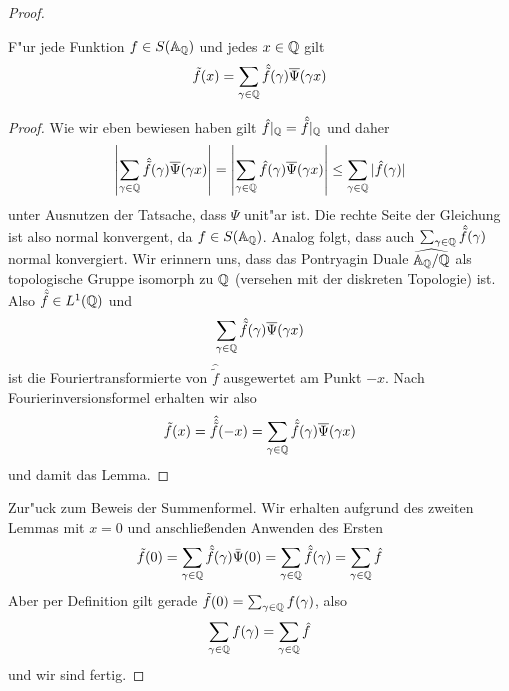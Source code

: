 \begin{proof}
		\begin{lemma}
			F"ur jede Funktion $f \in S(\mathbb{A}_{\mathbb{Q}})$ und jedes $x\in \mathbb{Q}$ gilt
			\begin{align*}
				\tilde{f}(x) = \sum_{\gamma \in \mathbb{Q}} {\hat{\tilde{f}}(\gamma)\overline{\Psi}(\gamma x)}
			\end{align*}
		\end{lemma}
		\begin{proof}
			Wie wir eben bewiesen haben gilt $\hat{f}|_{\mathbb{Q}} = \hat{\tilde{f}}|_{\mathbb{Q}}$ und daher
			\begin{align*}
				\left| \sum_{\gamma \in \mathbb{Q}} {\hat{\tilde{f}}(\gamma)\overline{\Psi}(\gamma x)}\right| = 
				\left| \sum_{\gamma \in \mathbb{Q}} {\hat{f}(\gamma)\overline{\Psi}(\gamma x)}\right| 
				\leq \sum_{\gamma \in \mathbb{Q}} {|\hat{f}(\gamma)|}
			\end{align*}
			unter Ausnutzen der Tatsache, dass $\Psi$ unit"ar ist. Die rechte Seite der Gleichung ist also normal konvergent, da $f \in S(\mathbb{A}_{\mathbb{Q}})$. Analog folgt, dass auch $\sum_{\gamma \in \mathbb{Q}} {\hat{\tilde{f}}(\gamma)}$ normal konvergiert. Wir erinnern uns, dass das Pontryagin Duale $\widehat{\mathbb{A}_{\mathbb{Q}}/\mathbb{Q}}$ als topologische Gruppe isomorph zu $\mathbb{Q}$ (versehen mit der diskreten Topologie) ist. Also $\hat{\tilde{f}} \in L^1(\mathbb{Q})$ und
			\begin{align*}
				\sum_{\gamma \in \mathbb{Q}} {\hat{\tilde{f}}(\gamma)\overline{\Psi}(\gamma x)}
			\end{align*}
			ist die Fouriertransformierte von $\hat{\tilde{f}}$ ausgewertet am Punkt $-x$. Nach Fourierinversionsformel erhalten wir also
			\begin{align*}
				\tilde{f}(x) = \hat{\hat{\tilde{f}}}(-x) = \sum_{\gamma \in \mathbb{Q}} {\hat{\tilde{f}}(\gamma)\overline{\Psi}(\gamma x)}
			\end{align*}
			und damit das Lemma.
		\end{proof}
		Zur"uck zum Beweis der Summenformel. Wir erhalten aufgrund des zweiten Lemmas mit $x=0$ und anschlie\ss enden Anwenden des Ersten
		\begin{align*}
			\tilde{f}(0) = 	\sum_{\gamma \in \mathbb{Q}} \hat{\tilde{f}}(\gamma) \bar{\Psi}(0) =
							\sum_{\gamma \in \mathbb{Q}} \hat{\tilde{f}}(\gamma) =
							\sum_{\gamma \in \mathbb{Q}} \hat{f}
		\end{align*}
		Aber per Definition gilt gerade $\tilde{f}(0) = \sum_{\gamma \in \mathbb{Q}}f(\gamma)$, also
		\begin{align*}
			\sum_{\gamma \in \mathbb{Q}}f(\gamma) = \sum_{\gamma \in \mathbb{Q}} \hat{f}
		\end{align*}
		und wir sind fertig.
		
	\end{proof}